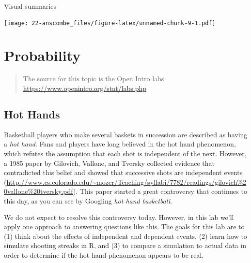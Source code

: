 \documentclass[]{book}
\newenvironment{Shaded}{\begin{snugshade}}{\end{snugshade}}
\newcommand{\KeywordTok}[1]{\textcolor[rgb]{0.13,0.29,0.53}{\textbf{{#1}}}}
\newcommand{\DataTypeTok}[1]{\textcolor[rgb]{0.13,0.29,0.53}{{#1}}}
\newcommand{\DecValTok}[1]{\textcolor[rgb]{0.00,0.00,0.81}{{#1}}}
\newcommand{\StringTok}[1]{\textcolor[rgb]{0.31,0.60,0.02}{{#1}}}
\newcommand{\NormalTok}[1]{{#1}}
\theoremstyle{definition}
\theoremstyle{definition}
\theoremstyle{remark}
\begin{document}
Visual summaries

\begin{Shaded}
\end{Shaded}

\texttt{[image: 22-anscombe\_files/figure-latex/unnamed-chunk-9-1.pdf]}

\hypertarget{probability}{\chapter*{Probability}\label{probability}}

\begin{quote}
The source for this topic is the Open Intro labs
\url{https://www.openintro.org/stat/labs.php}
\end{quote}

\section*{Hot Hands}\label{hot-hands}

Basketball players who make several baskets in succession are described
as having a \emph{hot hand}. Fans and players have long believed in the
hot hand phenomenon, which refutes the assumption that each shot is
independent of the next. However, a 1985 paper by Gilovich, Vallone, and
Tversky collected evidence that contradicted this belief and showed that
successive shots are independent events
(\url{http://www.cs.colorado.edu/~mozer/Teaching/syllabi/7782/readings/gilovich\%20vallone\%20tversky.pdf}).
This paper started a great controversy that continues to this day, as
you can see by Googling \emph{hot hand basketball}.

We do not expect to resolve this controversy today. However, in this lab
we'll apply one approach to answering questions like this. The goals for
this lab are to (1) think about the effects of independent and dependent
events, (2) learn how to simulate shooting streaks in R, and (3) to
compare a simulation to actual data in order to determine if the hot
hand phenomenon appears to be real.
\end{document}
